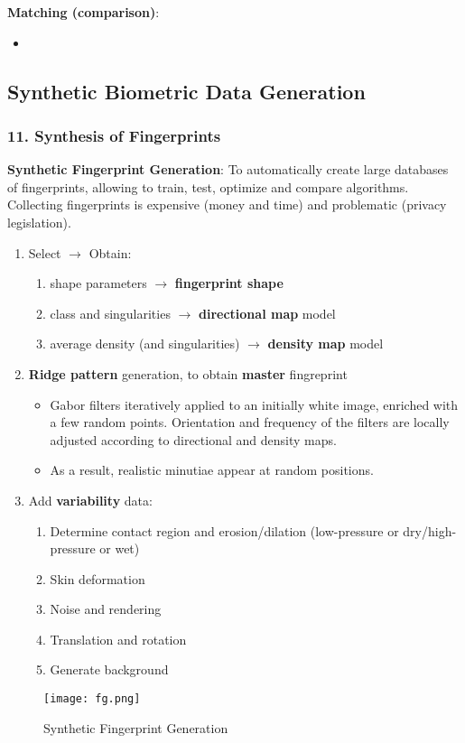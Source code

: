 \documentclass[a4paper]{article}
\begin{document}
      \textbf{Matching (comparison)}:
      \begin{itemize}
        \item 
      \end{itemize}
  \subsection*{Synthetic Biometric Data Generation}
    \subsubsection*{11. Synthesis of Fingerprints}
      \textbf{Synthetic Fingerprint Generation}: To automatically create large databases of fingerprints, allowing to train, test, optimize and compare algorithms. Collecting fingerprints is expensive (money and time) and problematic (privacy legislation).
      \begin{enumerate}
        \item Select  $\rightarrow$ Obtain:
        \begin{enumerate}
          \item shape parameters $\rightarrow$ \textbf{fingerprint shape}
          \item class and singularities $\rightarrow$ \textbf{directional map} model
          \item average density (and singularities) $\rightarrow$ \textbf{density map} model
        \end{enumerate}
        \item \textbf{Ridge pattern} generation, to obtain \textbf{master} fingreprint
        \begin{itemize}
          \item Gabor filters iteratively applied to an initially white image, enriched with a few random points. Orientation and frequency of the filters are locally adjusted according to directional and density maps.
          \item As a result, realistic minutiae appear at random positions.
        \end{itemize}
        \item Add \textbf{variability} data:
        \begin{enumerate}
          \item Determine contact region and erosion/dilation (low-pressure or dry/high-pressure or wet)
          \item Skin deformation
          \item Noise and rendering
          \item Translation and rotation
          \item Generate background
        \end{enumerate}
      \end{enumerate}
      \begin{figure}[htp]
        \centering
          \texttt{[image: fg.png]}
          \caption{Synthetic Fingerprint Generation}
          \label{fig:fg}
      \end{figure}
  \newpage
\end{document}
